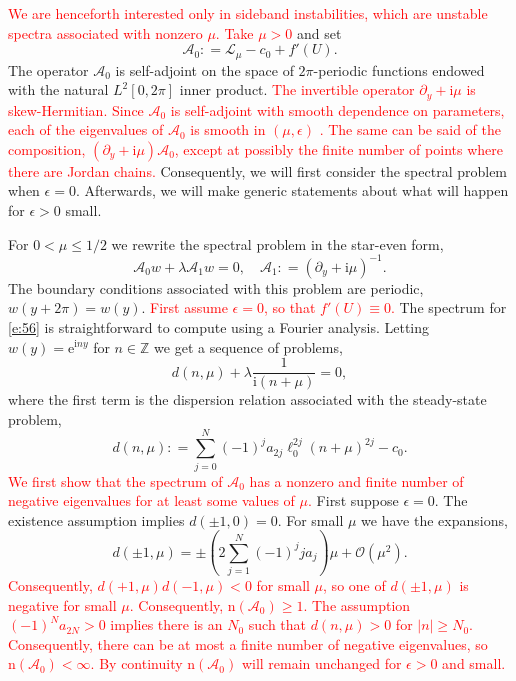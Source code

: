 \documentclass[review,onefignum,onetabnum]{siamart171218}
\newcommand{\Z}{\mathbb{Z}}
\def\coloneqq{\mathrel{\mathop:}=}
\newcommand{\rme}{\mathrm{e}}
\newcommand{\rmi}{\mathrm{i}}
\newcommand{\rmn}{\mathrm{n}}
\newcommand{\calA}{\mathcal{A}}
\newcommand{\calL}{\mathcal{L}}
\newcommand{\calO}{\mathcal{O}}
\newcommand{\revised}[1]{ \textcolor{red}{#1} }
\begin{document}
\revised{
We are henceforth interested only in sideband instabilities, which are unstable spectra associated with nonzero $\mu$. Take $\mu>0$
} and set
\[
\calA_0\coloneqq\calL_\mu-c_0+f'(U).
\]
The operator $\calA_0$ is self-adjoint on the space of $2\pi$-periodic
functions endowed with the natural $L^2[0,2\pi]$ inner product.
\revised{
The invertible operator $\partial_y+\rmi\mu$ is skew-Hermitian.  Since $\calA_0$ is self-adjoint with smooth dependence on parameters, each of the eigenvalues of $\calA_0$ is smooth in $(\mu,\epsilon)$ \cite{kato:ptf80}. The same can be said of the composition, $(\partial_y+\rmi\mu)\calA_0$, except at possibly the finite number of points where there are Jordan chains.
}
Consequently, we will first consider the spectral problem
when $\epsilon=0$. Afterwards, we will make generic statements about what
will happen for $\epsilon>0$ small.

For $0<\mu\le1/2$ we rewrite the spectral problem in the star-even form,
\begin{equation}\label{e:56}
\calA_0w+\lambda\calA_1w=0,\quad
\calA_1\coloneqq\left(\partial_y+\rmi\mu\right)^{-1}.
\end{equation}
The boundary conditions associated with this problem are periodic,
$w(y+2\pi)=w(y)$.
\revised{
First assume $\epsilon=0$, so that $f'(U)\equiv0$.
}
The spectrum for \cref{e:56} is straightforward to compute using a Fourier analysis. Letting
$w(y)=\rme^{\rmi ny}$ for $n\in\Z$ we get a sequence of problems,
\begin{equation}\label{e:57}
d(n,\mu)+\lambda\frac{1}{\rmi(n+\mu)}=0,
\end{equation}
where the first term is the dispersion relation associated with the
steady-state problem,
\[
d(n,\mu)\coloneqq\sum_{j=0}^N(-1)^ja_{2j}\ell_0^{2j}(n+\mu)^{2j}-c_0.
\]
\revised{
We first show that the spectrum of $\calA_0$ has a nonzero and finite number of negative eigenvalues for at least some values of $\mu$.
}
First suppose $\epsilon=0$.
The existence assumption implies $d(\pm1,0)=0$. For small $\mu$ we have the
expansions,
\begin{equation}\label{e:58}
d(\pm1,\mu)=\pm\left(2\sum_{j=1}^N(-1)^jja_j\right)\mu+\calO(\mu^2).
\end{equation}
\revised{
Consequently, $d(+1,\mu)d(-1,\mu)<0$ for small $\mu$, so one of $d(\pm1,\mu)$ is negative for small $\mu$. Consequently, $\rmn(\calA_0)\ge1$. The assumption $(-1)^Na_{2N}>0$ implies there
is an $N_0$ such that $d(n,\mu)>0$ for $|n|\ge N_0$. Consequently, there can be at most a finite number of negative eigenvalues, so
$\rmn(\calA_0)<\infty$. By continuity $\rmn(\calA_0)$ will remain unchanged for $\epsilon>0$ and small.
}
\end{document}
